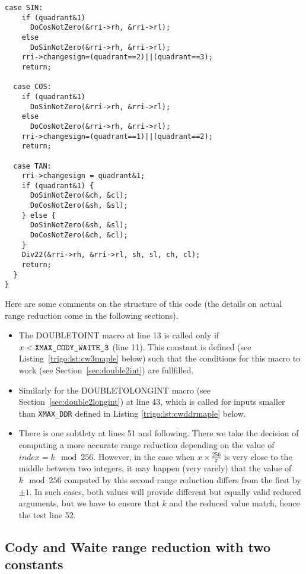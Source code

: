 \begin{lstlisting}[caption={Multilevel range reduction \label{lst:trig:argred}},firstnumber=1]
  case SIN: 
    if (quadrant&1)   
      DoCosNotZero(&rri->rh, &rri->rl);
    else 
      DoSinNotZero(&rri->rh, &rri->rl);
    rri->changesign=(quadrant==2)||(quadrant==3);
    return;

  case COS: 
    if (quadrant&1)   
      DoSinNotZero(&rri->rh, &rri->rl);
    else 
      DoCosNotZero(&rri->rh, &rri->rl);
    rri->changesign=(quadrant==1)||(quadrant==2);
    return;

  case TAN: 
    rri->changesign = quadrant&1;
    if (quadrant&1) {
      DoSinNotZero(&ch, &cl);
      DoCosNotZero(&sh, &sl);
    } else {
      DoSinNotZero(&sh, &sl);
      DoCosNotZero(&ch, &cl);
    }
    Div22(&rri->rh, &rri->rl, sh, sl, ch, cl);
    return;
  }
}
\end{lstlisting}
 

Here are some comments on the structure of this code (the details on
actual range reduction come in the following sections).

\begin{itemize}
\item The DOUBLETOINT macro at line 13 is called only if
  $x<\verb!XMAX_CODY_WAITE_3!$ (line 11). This constant is defined  (see
  Listing~\ref{trigo:lst:cw3maple} below) such
  that the conditions for this macro to work (see
  Section~\ref{sec:double2int}) are fullfilled. 

\item Similarly for the DOUBLETOLONGINT macro (see
  Section~\ref{sec:double2longint}) at line 43, which is called for
  inputs smaller than \verb!XMAX_DDR! defined in Listing
  \ref{trigo:lst:cwddrmaple} below.

\item There is one subtlety at lines 51 and following. There we take
  the decision of computing a more accurate range reduction depending
  on the value of $\mathit{index}=k\mod 256$. However, in the case
  when $x\times\frac{256}{\pi}$ is very close to the middle between
  two integers, it may happen (very rarely) that the value of $k\mod
  256$ computed by this second range reduction differs from the first
  by $\pm 1$. In such cases, both values will provide different but
  equally valid reduced arguments, but we have to ensure that $k$ and
  the reduced value match, hence the test line 52.
\end{itemize}



\subsection{Cody and Waite range reduction with two constants}


